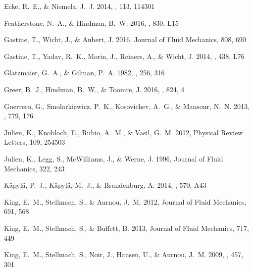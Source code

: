 \documentclass[twocolumn, amsmath, amsfonts, amssymb, trackchanges]{aastex62}
\begin{document}
\begin{thebibliography}{}
{Ecke}, R.~E., \& {Niemela}, J.~J. 2014, \prl, 113, 114301

{Featherstone}, N.~A., \& {Hindman}, B.~W. 2016, \apj, 830, L15

{Gastine}, T., {Wicht}, J., \& {Aubert}, J. 2016, Journal of Fluid Mechanics,
  808, 690

{Gastine}, T., {Yadav}, R.~K., {Morin}, J., {Reiners}, A., \& {Wicht}, J. 2014,
  \mnras, 438, L76

{Glatzmaier}, G.~A., \& {Gilman}, P.~A. 1982, \apj, 256, 316

{Greer}, B.~J., {Hindman}, B.~W., \& {Toomre}, J. 2016, \apj, 824, 4

{Guerrero}, G., {Smolarkiewicz}, P.~K., {Kosovichev}, A.~G., \& {Mansour},
  N.~N. 2013, \apj, 779, 176

{Julien}, K., {Knobloch}, E., {Rubio}, A.~M., \& {Vasil}, G.~M. 2012, Physical
  Review Letters, 109, 254503

{Julien}, K., {Legg}, S., {McWilliams}, J., \& {Werne}, J. 1996, Journal of
  Fluid Mechanics, 322, 243

{K{\"a}pyl{\"a}}, P.~J., {K{\"a}pyl{\"a}}, M.~J., \& {Brandenburg}, A. 2014,
  \aap, 570, A43

{King}, E.~M., {Stellmach}, S., \& {Aurnou}, J.~M. 2012, Journal of Fluid
  Mechanics, 691, 568

{King}, E.~M., {Stellmach}, S., \& {Buffett}, B. 2013, Journal of Fluid
  Mechanics, 717, 449

{King}, E.~M., {Stellmach}, S., {Noir}, J., {Hansen}, U., \& {Aurnou}, J.~M.
  2009, \nat, 457, 301


\end{thebibliography}
\end{document}
